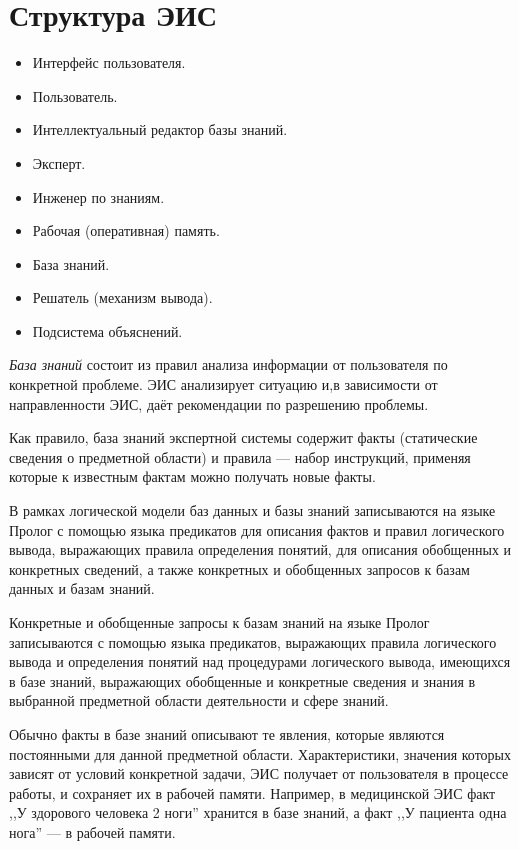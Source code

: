 \documentclass[a4paper,12pt,notitlepage,pdftex,headsepline]{scrartcl}
\begin{document}
\section{Структура ЭИС}
  \begin{itemize}
    \item Интерфейс пользователя.
    \item Пользователь.
    \item Интеллектуальный редактор базы знаний.
    \item Эксперт.
    \item Инженер по знаниям.
    \item Рабочая (оперативная) память.
    \item База знаний.
    \item Решатель (механизм вывода).
    \item Подсистема объяснений.
  \end{itemize}

  \textit{База знаний} состоит из правил анализа информации от пользователя по
  конкретной проблеме.
  ЭИС анализирует ситуацию и,в зависимости от направленности ЭИС, даёт
  рекомендации по разрешению проблемы.

  Как правило, база знаний экспертной системы содержит факты (статические
  сведения о предметной области) и правила --- набор инструкций, применяя
  которые к известным фактам можно получать новые факты.

  В рамках логической модели баз данных и базы знаний записываются на языке
  Пролог с помощью языка предикатов для описания фактов и правил логического
  вывода, выражающих правила определения понятий, для описания обобщенных и
  конкретных сведений, а также конкретных и обобщенных запросов к базам данных
  и базам знаний.

  Конкретные и обобщенные запросы к базам знаний на языке Пролог записываются
  с помощью языка предикатов, выражающих правила логического вывода и
  определения понятий над процедурами логического вывода, имеющихся в базе
  знаний, выражающих обобщенные и конкретные сведения и знания в выбранной
  предметной области деятельности и сфере знаний.

  Обычно факты в базе знаний описывают те явления, которые являются
  постоянными для данной предметной области.
  Характеристики, значения которых зависят от условий конкретной задачи, ЭИС
  получает от пользователя в процессе работы, и сохраняет их в рабочей памяти.
  Например, в медицинской ЭИС факт ,,У здорового человека 2 ноги'' хранится в
  базе знаний, а факт ,,У пациента одна нога'' --- в рабочей памяти.
\end{document}

